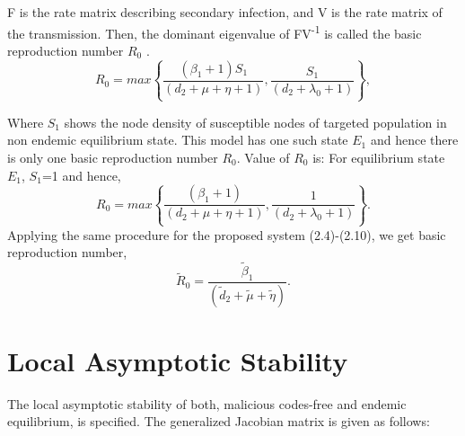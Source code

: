 \par F is the rate matrix describing secondary infection, and V is the rate matrix
of the transmission. Then, the dominant eigenvalue of FV\textsuperscript{-1}
is called the basic reproduction number $R_{0}$ .
\begin{equation} R_0 = max \left\{\frac{(\beta_1+1) S_1}{(d_2+\mu+\eta+1)},\frac{S_1}{(d_2+\lambda_0+1)} \right\} , \end{equation}
\par Where $S_1$ shows the node density of susceptible nodes of targeted
 population in non endemic equilibrium state. This model has one such
 state $E_1$ and hence there is only one basic reproduction number $R_0$. Value of $R_0$ is:
For equilibrium state $E_1$,
$S_1$=1 and hence,
\begin{equation} R_0 = max \left\{\frac{(\beta_1+1)}{(d_2+\mu+\eta+1)},\frac{1}{(d_2+\lambda_0+1)} \right\} . \end{equation}
Applying the same procedure for the proposed system (2.4)-(2.10), we get basic reproduction number,
\begin{equation}\tilde R_0 =\frac{\tilde \beta_1}{(\tilde d_2+ \tilde \mu+\tilde \eta)} . \end{equation}

\section{ Local Asymptotic Stability}
The local asymptotic stability of both, malicious codes-free and endemic equilibrium, is
 specified. The generalized Jacobian matrix is given as follows:


